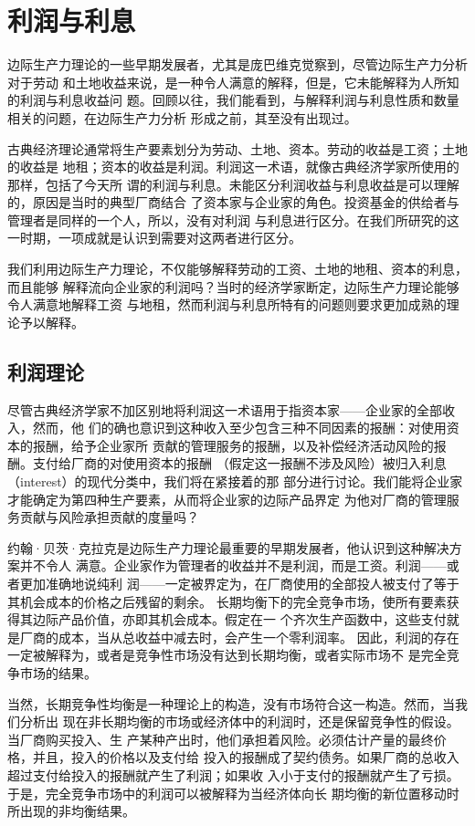 \section{利润与利息}

边际生产力理论的一些早期发展者，尤其是庞巴维克觉察到，尽管边际生产力分析对于劳动
和土地收益来说，是一种令人满意的解释，但是，它未能解释为人所知的利润与利息收益问
题。回顾以往，我们能看到，与解释利润与利息性质和数量相关的问题，在边际生产力分析
形成之前，其至没有出现过。

古典经济理论通常将生产要素划分为劳动、土地、资本。劳动的收益是工资；土地的收益是
地租；资本的收益是利润。利润这一术语，就像古典经济学家所使用的那样，包括了今天所
谓的利润与利息。未能区分利润收益与利息收益是可以理解的，原因是当时的典型厂商结合
了资本家与企业家的角色。投资基金的供给者与管理者是同样的一个人，所以，没有对利润
与利息进行区分。在我们所研究的这一时期，一项成就是认识到需要对这两者进行区分。

我们利用边际生产力理论，不仅能够解释劳动的工资、土地的地租、资本的利息，而且能够
解释流向企业家的利润吗？当时的经济学家断定，边际生产力理论能够令人满意地解释工资
与地租，然而利润与利息所特有的问题则要求更加成熟的理论予以解释。

\subsection{利润理论}

尽管古典经济学家不加区别地将利润这一术语用于指资本家——企业家的全部收入，然而，他
们的确也意识到这种收入至少包含三种不同因素的报酬：对使用资本的报酬，给予企业家所
贡献的管理服务的报酬，以及补偿经济活动风险的报酬。支付给厂商的对使用资本的报酬
（假定这一报酬不涉及风险）被归入利息（interest）的现代分类中，我们将在紧接着的那
部分进行讨论。我们能将企业家才能确定为第四种生产要素，从而将企业家的边际产品界定
为他对厂商的管理服务贡献与风险承担贡献的度量吗？

约翰·贝茨·克拉克是边际生产力理论最重要的早期发展者，他认识到这种解决方案并不令人
满意。企业家作为管理者的收益并不是利润，而是工资。利润——或者更加准确地说纯利
润——一定被界定为，在厂商使用的全部投人被支付了等于其机会成本的价格之后残留的剩余。
长期均衡下的完全竞争市场，使所有要素获得其边际产品价值，亦即其机会成本。假定在一
个齐次生产函数中，这些支付就是厂商的成本，当从总收益中减去时，会产生一个零利润率。
因此，利润的存在一定被解释为，或者是竞争性市场没有达到长期均衡，或者实际市场不
是完全竞争市场的结果。

当然，长期竞争性均衡是一种理论上的构造，没有市场符合这一构造。然而，当我们分析出
现在非长期均衡的市场或经济体中的利润时，还是保留竞争性的假设。当厂商购买投入、生
产某种产出时，他们承担着风险。必须估计产量的最终价格，并且，投入的价格以及支付给
投入的报酬成了契约债务。如果厂商的总收入超过支付给投入的报酬就产生了利润；如果收
入小于支付的报酬就产生了亏损。于是，完全竞争市场中的利润可以被解释为当经济体向长
期均衡的新位置移动时所出现的非均衡结果。

